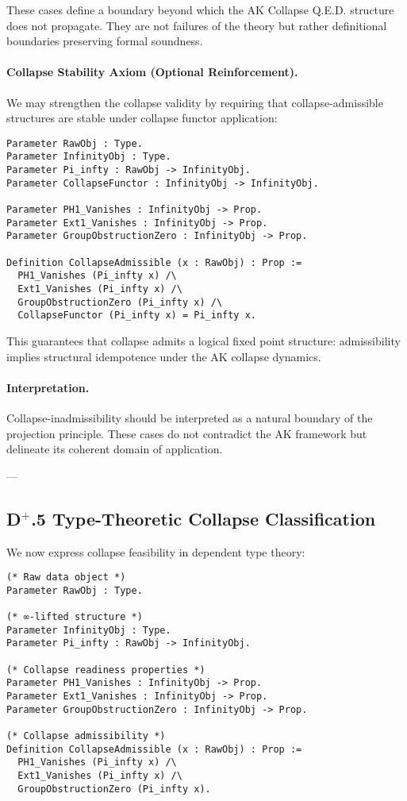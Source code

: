 \documentclass[11pt]{article}
\begin{document}
These cases define a boundary beyond which the AK Collapse Q.E.D. structure does not propagate. They are not failures of the theory but rather definitional boundaries preserving formal soundness.

\paragraph{Collapse Stability Axiom (Optional Reinforcement).}

We may strengthen the collapse validity by requiring that collapse-admissible structures are stable under collapse functor application:

\begin{lstlisting}[language=Coq, caption=Collapse Stability Axiom]
Parameter RawObj : Type.
Parameter InfinityObj : Type.
Parameter Pi_infty : RawObj -> InfinityObj.
Parameter CollapseFunctor : InfinityObj -> InfinityObj.

Parameter PH1_Vanishes : InfinityObj -> Prop.
Parameter Ext1_Vanishes : InfinityObj -> Prop.
Parameter GroupObstructionZero : InfinityObj -> Prop.

Definition CollapseAdmissible (x : RawObj) : Prop :=
  PH1_Vanishes (Pi_infty x) /\
  Ext1_Vanishes (Pi_infty x) /\
  GroupObstructionZero (Pi_infty x) /\
  CollapseFunctor (Pi_infty x) = Pi_infty x.
\end{lstlisting}

This guarantees that collapse admits a logical fixed point structure: admissibility implies structural idempotence under the AK collapse dynamics.

\paragraph{Interpretation.}
Collapse-inadmissibility should be interpreted as a natural boundary of the projection principle. These cases do not contradict the AK framework but delineate its coherent domain of application.

---

\subsection*{D$^{+}$.5 Type-Theoretic Collapse Classification}

We now express collapse feasibility in dependent type theory:

\begin{lstlisting}[language=Coq, mathescape=false]
(* Raw data object *)
Parameter RawObj : Type.

(* ∞-lifted structure *)
Parameter InfinityObj : Type.
Parameter Pi_infty : RawObj -> InfinityObj.

(* Collapse readiness properties *)
Parameter PH1_Vanishes : InfinityObj -> Prop.
Parameter Ext1_Vanishes : InfinityObj -> Prop.
Parameter GroupObstructionZero : InfinityObj -> Prop.

(* Collapse admissibility *)
Definition CollapseAdmissible (x : RawObj) : Prop :=
  PH1_Vanishes (Pi_infty x) /\
  Ext1_Vanishes (Pi_infty x) /\
  GroupObstructionZero (Pi_infty x).
\end{lstlisting}
\end{document}
